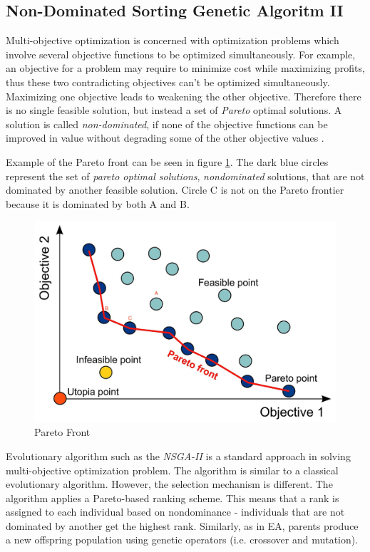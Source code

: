 \documentclass[format=acmsmall, review=false, screen=true]{acmart}
\begin{document}
\subsection{Non-Dominated Sorting Genetic Algoritm II}

Multi-objective optimization is concerned with optimization problems which involve several objective functions to be optimized simultaneously. For example, an objective for a problem may require to minimize cost while maximizing profits, thus these two contradicting objectives can't be optimized simultaneously. Maximizing one objective leads to weakening the other objective. Therefore there is no single feasible solution, but instead a set of \emph{Pareto} optimal solutions.  A solution is called \emph{non-dominated}, if none of the objective functions can be improved in value without degrading some of the other objective values \cite{deb2014multi}.

Example of the Pareto front can be seen in figure \ref{fig:paretofront}. The dark blue circles represent the set of \emph{pareto optimal solutions}, \emph{nondominated} solutions, that are not dominated by another feasible solution. Circle C is not on the Pareto frontier because it is dominated by both A and B.

\begin{figure}[H]
  \includegraphics[width=0.66\linewidth]{img/pareto_front.JPG}
  \caption{\label{fig:paretofront}Pareto Front}
\end{figure}

Evolutionary algorithm such as the \emph{NSGA-II} \cite{deb200fast} is a standard approach in solving multi-objective optimization problem. The algorithm is similar to a classical evolutionary algorithm. However, the selection mechanism is different. The algorithm applies a Pareto-based ranking scheme. This means that a rank is assigned to each individual based on nondominance - individuals that are not dominated by another get the highest rank. Similarly, as in EA, parents produce a new offspring population using genetic operators (i.e. crossover and mutation).
\end{document}
